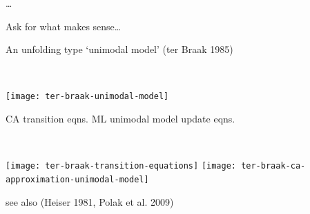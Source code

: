 \documentclass{mediumfoils}
\newcommand{\mkgrey}[1]{{\color{pale}#1}}
\begin{document}
\ldots

Ask for what makes sense\ldots

\slide{}


An unfolding type `unimodal model' \mkgrey{(ter Braak 1985)}

~\\
\centerline{\texttt{[image: ter-braak-unimodal-model]}}

CA transition eqns. \hfill ML unimodal model update eqns.

~\\
\centerline{\texttt{[image: ter-braak-transition-equations]}
\texttt{[image: ter-braak-ca-approximation-unimodal-model]}}

see also \mkgrey{(Heiser 1981, Polak et al. 2009)}
\end{document}
